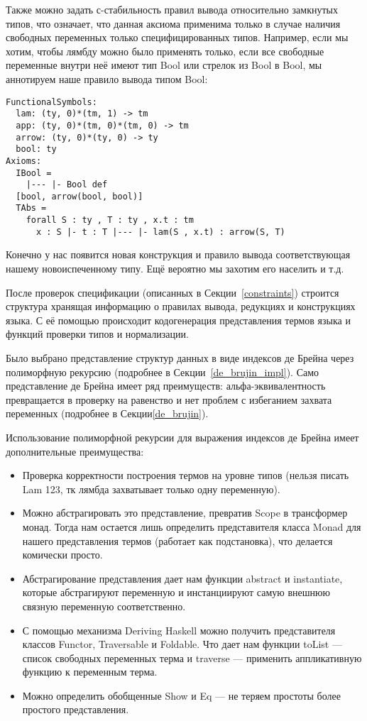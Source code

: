 Также можно задать с-стабильность правил вывода относительно замкнутых типов, что означает, что данная аксиома применима только в случае наличия свободных переменных только специфицированных типов. Например, если мы хотим, чтобы лямбду можно было применять только, если все свободные переменные внутри неё имеют тип Bool или стрелок из Bool в Bool, мы аннотируем наше правило вывода типом Bool:

\begin{minipage}{\linewidth}
\begin{lstlisting}[frame=single]
FunctionalSymbols:
  lam: (ty, 0)*(tm, 1) -> tm
  app: (ty, 0)*(tm, 0)*(tm, 0) -> tm
  arrow: (ty, 0)*(ty, 0) -> ty
  bool: ty
Axioms:
  IBool =
    |--- |- Bool def
  [bool, arrow(bool, bool)]
  TAbs =
    forall S : ty , T : ty , x.t : tm
      x : S |- t : T |--- |- lam(S , x.t) : arrow(S, T)
\end{lstlisting}
\end{minipage}

Конечно у нас появится новая конструкция и правило вывода соответствующая нашему новоиспеченному типу. Ещё вероятно мы захотим его населить и т.д.

\hfill

После проверок спецификации (описанных в Секции~\ref{constraints}) строится структура хранящая информацию о правилах вывода, редукциях и конструкциях языка. С её помощью происходит кодогенерация представления термов языка и функций проверки типов и нормализации.

Было выбрано представление структур данных в виде индексов де Брейна через полиморфную рекурсию (подробнее в Секции~\ref{de_brujin_impl}). Само представление де Брейна имеет ряд преимуществ: альфа-эквивалентность превращается в проверку на равенство и нет проблем с избеганием захвата переменных (подробнее в Секции\ref{de_brujin}).

Использование полиморфной рекурсии для выражения индексов де Брейна имеет дополнительные преимущества:
\begin{itemize}
  \item Проверка корректности построения термов на уровне типов (нельзя писать Lam 123, тк лямбда захватывает только одну переменную).
  \item Можно абстрагировать это представление, превратив Scope в трансформер монад. Тогда нам остается лишь определить представителя класса Monad для нашего представления термов (работает как подстановка), что делается комически просто.
  \item Абстрагирование представления дает нам функции abstract и instantiate, которые абстрагируют переменную и инстанциируют самую внешнюю связную переменную соответственно.
  \item С помощью механизма Deriving Haskell можно получить представителя классов Functor, Traversable и Foldable. Что дает нам функции toList --- список свободных переменных терма и traverse --- применить аппликативную функцию к переменным терма.
  \item Можно определить обобщенные Show и Eq --- не теряем простоты более простого представления.
\end{itemize}


